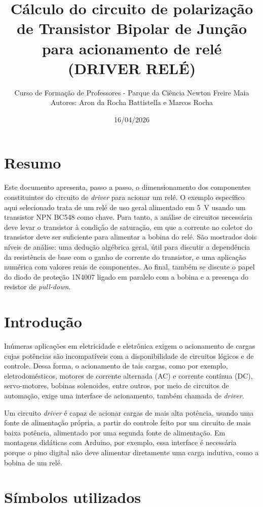 \documentclass[12pt,a4paper]{article}
\title{Cálculo do circuito de polarização de Transistor Bipolar de Junção para acionamento de relé\\(DRIVER RELÉ)}
\author{Curso de Formação de Professores - Parque da Ciência Newton Freire Maia\\Autores: Aron da Rocha Battistella e Marcos Rocha}
\date{16/04/2026}
\begin{document}
\maketitle

\section*{Resumo}
\sloppy
\noindent Este documento apresenta, passo a passo, o dimensionamento dos componentes constituintes do circuito de \emph{driver} para acionar um relé. O exemplo específico aqui selecionado trata de um relé de uso geral alimentado em \SI{5}{V} usando um transistor NPN BC548 como chave. Para tanto, a análise de circuitos necessária deve levar o transistor à condição de saturação, em que a corrente no coletor do transistor deve ser suficiente para alimentar a bobina do relé. São mostrados dois níveis de análise: uma dedução algébrica geral, útil para discutir a dependência da resistência de base com o ganho de corrente do transistor, e uma aplicação numérica com valores reais de componentes. Ao final, também se discute o papel do diodo de proteção 1N4007 ligado em paralelo com a bobina e a presença do resistor de \emph{pull-down}.

\section{Introdução}

Inúmeras aplicações em eletricidade e eletrônica exigem o acionamento de cargas cujas potências são incompatíveis com a disponibilidade de circuitos lógicos e de controle. Dessa forma, o acionamento de tais cargas, como por exemplo, eletrodomésticos, motores de corrente alternada (AC) e corrente contínua (DC), servo-motores, bobinas solenoides, entre outros, por meio de circuitos de automação, exige uma interface de acionamento, também chamada de \emph{driver}.

Um circuito \emph{driver} é capaz de acionar cargas de mais alta potência, usando uma fonte de alimentação própria, a partir do controle feito por um circuito de mais baixa potência, alimentado por uma segunda fonte de alimentação. Em montagens didáticas com Arduino, por exemplo, essa interface é necessária porque o pino digital não deve alimentar diretamente uma carga indutiva, como a bobina de um relé.

\section{Símbolos utilizados}
\end{document}

